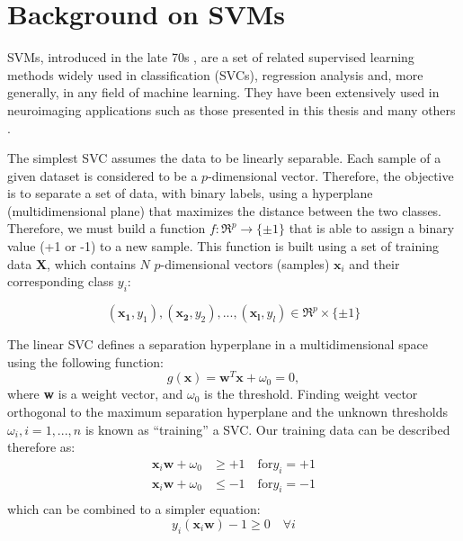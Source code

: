 \chapter{Background on \acfp{SVM}}\label{ch:svm}
\acfp{SVM}, introduced in the late 70s \cite{Vapnik1998}, are a set of related supervised learning methods widely used in classification (\acp{SVC}), regression analysis and, more generally, in any field of machine learning. They have been extensively used in neuroimaging applications such as those presented in this thesis \cite{Martinez-Murcia2013255,Martinez-Murcia201458,martinez2014parametrization,Martinez-Murcia2015,Martinez-Murcia2016,Martinez-Murcia2016a} and many others \cite{Stoeckel04,Towey2011,Illan2011,Illan2012,Ortiz2013,Segovia2016a}.

The simplest \ac{SVC} assumes the data to be linearly separable. Each sample of a given dataset is considered to be a $p$-dimensional vector. Therefore, the objective is to separate a set of data, with binary labels, using a hyperplane (multidimensional plane) that maximizes the distance between the two classes. Therefore, we must build a function $f : \Re^p \rightarrow \lbrace \pm1 \rbrace$ that is able to assign a binary value (+1 or -1) to a new sample. This function is built using a set of training data $\mathbf{X}$, which contains $N$ $p$-dimensional vectors (samples) $\mathbf{x}_i$ and their corresponding class $y_i$: 

\begin{equation}
(\mathbf{x_1} , y_1 ), (\mathbf{x_2} , y_2 ), ..., (\mathbf{x_l} , y_l ) \in \Re^p \times \lbrace \pm 1\rbrace
\end{equation}

The linear \ac{SVC} defines a separation hyperplane in a multidimensional space using the following function: 
\begin{equation}
g(\textbf{x}) = \textbf{w}^T \textbf{x} + \omega_0 = 0,
\end{equation}
where \textbf{w} is a weight vector, and $\omega_0$ is the threshold. Finding weight vector orthogonal to the maximum separation hyperplane and the unknown thresholds  $\omega_i , i = 1,...,n$ is known as ``training'' a \ac{SVC}. Our training data can be described therefore as: 
\begin{align}
	\mathbf{x}_i\mathbf{w} + \omega_0 &\ge +1 \quad \text{for} y_i = +1\\
	\mathbf{x}_i\mathbf{w} + \omega_0 &\le -1 \quad \text{for} y_i = -1\\
\end{align}
which can be combined to a simpler equation:
\begin{equation}\label{eq:constraint}
	y_i(\mathbf{x}_i\mathbf{w})-1\ge 0 \quad \forall i
\end{equation}

